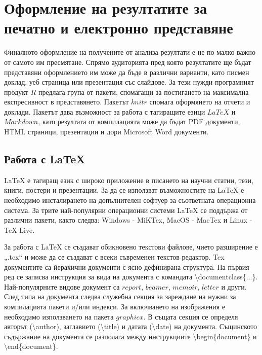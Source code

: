 ﻿\newpage
\chapter{Оформление на резултатите за печатно и електронно представяне}
\label{chapter11}
\thispagestyle{empty}

Финалното оформление на получените от анализа резултати е не по-малко важно от самото им пресмятане. Спрямо аудиторията пред която резултатите ще бъдат представяни оформлението им може да бъде в различни варианти, като писмен доклад, уеб страница или презентация със слайдове. За тези нужди програмният продукт $R$ предлага група от пакети, спомагащи за постигането на максимална експресивност в представянето. Пакетът $knitr$ спомага оформянето на отчети и доклади. Пакетът дава възможност за работа с тагиращите езици $LaTeX$ и $Markdown$, като резултата от компилацията може да бъдат PDF документи, HTML страници, презентации и дори Microsoft Word документи. 

\section{Работа с LaTeX}

LaTeX е тагиращ език с широко приложение в писането на научни статии, тези, книги, постери и презентации. За да се използват възможностите на LaTeX е необходимо инсталирането на допълнителен софтуер за съответната операционна система. За трите най-популярни операционни системи LaTeX се поддържа от различни пакети, както следва: Windows - MiKTex, MacOS - MacTex и Linux - TeX Live.

За работа с LaTeX се създават обикновено текстови файлове, чието разширение е „.tex“ и може да се създават с всеки съвременен текстов редактор. Tex документите са йерахични документи с ясно дефинирана структура. На първия ред се записва инструкция за вида на документа с командата \textbackslash documentclass\{...\}. Най-популярните видове документ са $report$, $beamer$, $memoir$, $letter$ и други. След типа на документа следва служебна секция за зареждане на нужни за компилацията пакети и/или индекси. За включването на изображения е необходимо използването на пакета $graphicx$. В същата секция се определя авторът (\textbackslash author), заглавието (\textbackslash title) и датата (\textbackslash date) на документа. Същинското съдържание на документа се разполага между инструкциите \textbackslash begin\{document\} и \textbackslash end\{document\}.

